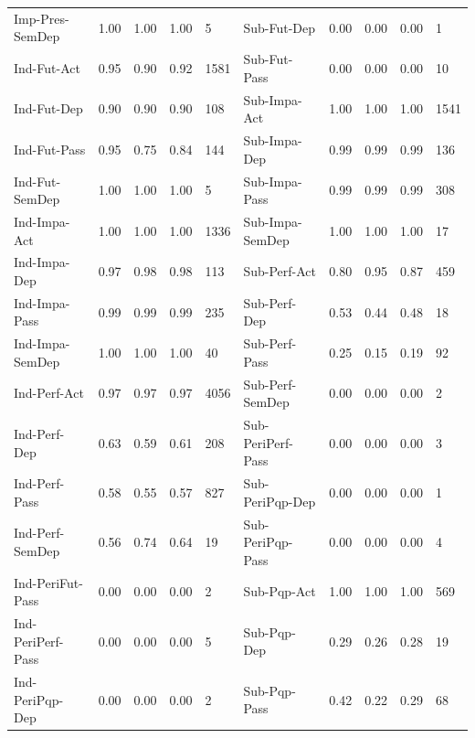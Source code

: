 \begin{table}[h]
{\begin{tabular}{@{}l|llll||l|llll@{}}
 Imp-Pres-SemDep   & 1.00      & 1.00   & 1.00     & 5       & Sub-Fut-Dep       & 0.00      & 0.00   & 0.00     & 1       \\ 
 Ind-Fut-Act       & 0.95      & 0.90   & 0.92     & 1581    & Sub-Fut-Pass      & 0.00      & 0.00   & 0.00     & 10      \\ 
 Ind-Fut-Dep       & 0.90      & 0.90   & 0.90     & 108     & Sub-Impa-Act      & 1.00      & 1.00   & 1.00     & 1541    \\ 
 Ind-Fut-Pass      & 0.95      & 0.75   & 0.84     & 144     & Sub-Impa-Dep      & 0.99      & 0.99   & 0.99     & 136     \\ 
 Ind-Fut-SemDep    & 1.00      & 1.00   & 1.00     & 5       & Sub-Impa-Pass     & 0.99      & 0.99   & 0.99     & 308     \\ 
 Ind-Impa-Act      & 1.00      & 1.00   & 1.00     & 1336    & Sub-Impa-SemDep   & 1.00      & 1.00   & 1.00     & 17      \\ 
 Ind-Impa-Dep      & 0.97      & 0.98   & 0.98     & 113     & Sub-Perf-Act      & 0.80      & 0.95   & 0.87     & 459     \\ 
 Ind-Impa-Pass     & 0.99      & 0.99   & 0.99     & 235     & Sub-Perf-Dep      & 0.53      & 0.44   & 0.48     & 18      \\ 
 Ind-Impa-SemDep   & 1.00      & 1.00   & 1.00     & 40      & Sub-Perf-Pass     & 0.25      & 0.15   & 0.19     & 92      \\ 
 Ind-Perf-Act      & 0.97      & 0.97   & 0.97     & 4056    & Sub-Perf-SemDep   & 0.00      & 0.00   & 0.00     & 2       \\ 
 Ind-Perf-Dep      & 0.63      & 0.59   & 0.61     & 208     & Sub-PeriPerf-Pass & 0.00      & 0.00   & 0.00     & 3       \\ 
 Ind-Perf-Pass     & 0.58      & 0.55   & 0.57     & 827     & Sub-PeriPqp-Dep   & 0.00      & 0.00   & 0.00     & 1       \\ 
 Ind-Perf-SemDep   & 0.56      & 0.74   & 0.64     & 19      & Sub-PeriPqp-Pass  & 0.00      & 0.00   & 0.00     & 4       \\ 
 Ind-PeriFut-Pass  & 0.00      & 0.00   & 0.00     & 2       & Sub-Pqp-Act       & 1.00      & 1.00   & 1.00     & 569     \\ 
 Ind-PeriPerf-Pass & 0.00      & 0.00   & 0.00     & 5       & Sub-Pqp-Dep       & 0.29      & 0.26   & 0.28     & 19      \\ 
 Ind-PeriPqp-Dep   & 0.00      & 0.00   & 0.00     & 2       & Sub-Pqp-Pass      & 0.42      & 0.22   & 0.29     & 68      \\ 

\end{tabular}}
\end{table}
